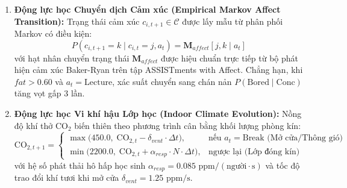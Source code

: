 \begin{enumerate}[label=\textbf{\arabic*.}]
  \item \textbf{Động lực học Chuyển dịch Cảm xúc (Empirical Markov Affect Transition):}
  Trạng thái cảm xúc $c_{i, t+1} \in \mathcal{C}$ được lấy mẫu từ phân phối Markov có điều kiện:
  \begin{equation}\label{eq:affect-markov}
    P(c_{i, t+1} = k \mid c_{i, t} = j, a_t) = \mathbf{M}_{affect}[j, k \mid a_t]
  \end{equation}
  với hạt nhân chuyển trạng thái $\mathbf{M}_{affect}$ được hiệu chuẩn trực tiếp từ bộ phát hiện cảm xúc Baker-Ryan trên tập ASSISTments with Affect. Chẳng hạn, khi $fat > 0.60$ và $a_t = \text{Lecture}$, xác suất chuyển sang chán nản $P(\text{Bored} \mid \text{Conc})$ tăng vọt gấp 3 lần.

  \item \textbf{Động lực học Vi khí hậu Lớp học (Indoor Climate Evolution):}
  Nồng độ khí thở $\text{CO}_2$ biến thiên theo phương trình cân bằng khối lượng phòng kín:
  \begin{equation}\label{eq:co2-evolution}
    \text{CO}_{2, t+1} = \begin{cases}
      \max\big(450.0, \; \text{CO}_{2, t} - \delta_{vent} \cdot \Delta t\big), & \text{nếu } a_t = \text{Break (Mở cửa/Thông gió)} \\
      \min\big(2200.0, \; \text{CO}_{2, t} + \alpha_{resp} \cdot N \cdot \Delta t\big), & \text{ngược lại (Lớp đóng kín)}
    \end{cases}
  \end{equation}
  với hệ số phát thải hô hấp học sinh $\alpha_{resp} = 0.085\text{ ppm}/(\text{người} \cdot \text{s})$ và tốc độ trao đổi khí tươi khi mở cửa $\delta_{vent} = 1.25\text{ ppm}/\text{s}$.
\end{enumerate}

